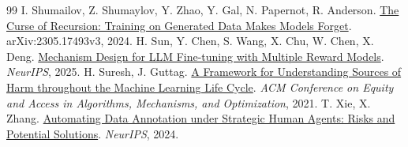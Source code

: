 {\begin{thebibliography}{99}
 I. Shumailov, Z. Shumaylov, Y. Zhao, Y. Gal, N. Papernot, R. Anderson. \href{https://arxiv.org/abs/2305.17493v3}{The Curse of Recursion: Training on Generated Data Makes Models Forget}. arXiv:2305.17493v3, 2024.
 H. Sun, Y. Chen, S. Wang, X. Chu, W. Chen, X. Deng. \href{https://arxiv.org/abs/2405.16276}{Mechanism Design for LLM Fine-tuning with Multiple Reward Models}. \emph{NeurIPS}, 2025.
 H. Suresh, J. Guttag. \href{https://doi.org/10.1145/3465416.3483305}{A Framework for Understanding Sources of Harm throughout the Machine Learning Life Cycle}. \emph{ACM Conference on Equity and Access in Algorithms, Mechanisms, and Optimization}, 2021.
 T. Xie, X. Zhang. \href{https://proceedings.neurips.cc/paper_files/paper/2024/hash/e664650506f1cf2b4696df892147c06e-Abstract-Conference.html}{Automating Data Annotation under Strategic Human Agents: Risks and Potential Solutions}. \emph{NeurIPS}, 2024.
\end{thebibliography}}
